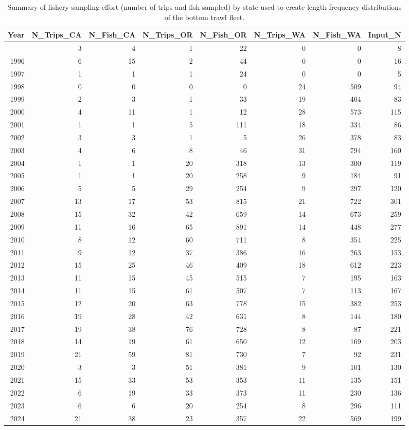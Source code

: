 \documentclass[
]{scrartcl}
\begin{document}
\endgroup

\newpage{}

\begingroup
\fontsize{9.0pt}{10.8pt}\selectfont

\begin{longtable}{rrrrrrrr}

\caption{\label{tbl-BT_lengths_sample_sizes}Summary of fishery sampling
effort (number of trips and fish sampled) by state used to create length
frequency distributions of the bottom trawl fleet.}

\tabularnewline

\toprule
Year & N\_Trips\_CA & N\_Fish\_CA & N\_Trips\_OR & N\_Fish\_OR & N\_Trips\_WA & N\_Fish\_WA & Input\_N \\ 
\midrule\addlinespace[2.5pt]
1995 & 3 & 4 & 1 & 22 & 0 & 0 & 8 \\ 
1996 & 6 & 15 & 2 & 44 & 0 & 0 & 16 \\ 
1997 & 1 & 1 & 1 & 24 & 0 & 0 & 5 \\ 
1998 & 0 & 0 & 0 & 0 & 24 & 509 & 94 \\ 
1999 & 2 & 3 & 1 & 33 & 19 & 404 & 83 \\ 
2000 & 4 & 11 & 1 & 12 & 28 & 573 & 115 \\ 
2001 & 1 & 1 & 5 & 111 & 18 & 334 & 86 \\ 
2002 & 3 & 3 & 1 & 5 & 26 & 378 & 83 \\ 
2003 & 4 & 6 & 8 & 46 & 31 & 794 & 160 \\ 
2004 & 1 & 1 & 20 & 318 & 13 & 300 & 119 \\ 
2005 & 1 & 1 & 20 & 258 & 9 & 184 & 91 \\ 
2006 & 5 & 5 & 29 & 254 & 9 & 297 & 120 \\ 
2007 & 13 & 17 & 53 & 815 & 21 & 722 & 301 \\ 
2008 & 15 & 32 & 42 & 659 & 14 & 673 & 259 \\ 
2009 & 11 & 16 & 65 & 891 & 14 & 448 & 277 \\ 
2010 & 8 & 12 & 60 & 711 & 8 & 354 & 225 \\ 
2011 & 9 & 12 & 37 & 386 & 16 & 263 & 153 \\ 
2012 & 15 & 25 & 46 & 409 & 18 & 612 & 223 \\ 
2013 & 11 & 15 & 45 & 515 & 7 & 195 & 163 \\ 
2014 & 11 & 15 & 61 & 507 & 7 & 113 & 167 \\ 
2015 & 12 & 20 & 63 & 778 & 15 & 382 & 253 \\ 
2016 & 19 & 28 & 42 & 631 & 8 & 144 & 180 \\ 
2017 & 19 & 38 & 76 & 728 & 8 & 87 & 221 \\ 
2018 & 14 & 19 & 61 & 650 & 12 & 169 & 203 \\ 
2019 & 21 & 59 & 81 & 730 & 7 & 92 & 231 \\ 
2020 & 3 & 3 & 51 & 381 & 9 & 101 & 130 \\ 
2021 & 15 & 33 & 53 & 353 & 11 & 135 & 151 \\ 
2022 & 6 & 19 & 33 & 373 & 11 & 230 & 136 \\ 
2023 & 6 & 6 & 20 & 254 & 8 & 296 & 111 \\ 
2024 & 21 & 38 & 23 & 357 & 22 & 569 & 199 \\ 
\bottomrule


\end{longtable}
\end{document}
